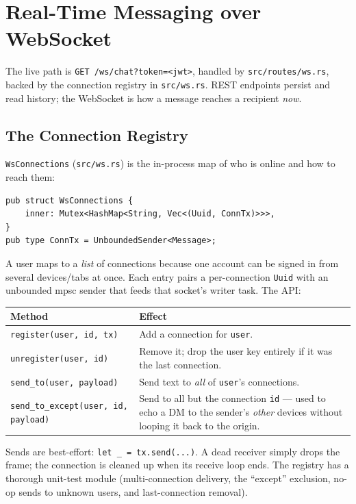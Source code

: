 \chapter{Real-Time Messaging over WebSocket}
\label{chap:websocket}

The live path is \verb|GET /ws/chat?token=<jwt>|, handled by
\verb|src/routes/ws.rs|, backed by the connection registry in \verb|src/ws.rs|.
REST endpoints persist and read history; the WebSocket is how a message reaches a
recipient \emph{now}.

\section{The Connection Registry}

\verb|WsConnections| (\verb|src/ws.rs|) is the in-process map of who is online and
how to reach them:

\begin{lstlisting}
pub struct WsConnections {
    inner: Mutex<HashMap<String, Vec<(Uuid, ConnTx)>>>,
}
pub type ConnTx = UnboundedSender<Message>;
\end{lstlisting}

A user maps to a \emph{list} of connections because one account can be signed in
from several devices/tabs at once. Each entry pairs a per-connection \verb|Uuid|
with an unbounded mpsc sender that feeds that socket's writer task. The API:

\begin{center}
\begin{tabular}{@{}lp{}@{}}
\toprule
\textbf{Method} & \textbf{Effect} \\
\midrule
\verb|register(user, id, tx)| & Add a connection for \verb|user|. \\
\verb|unregister(user, id)| & Remove it; drop the user key entirely if it was the last connection. \\
\verb|send_to(user, payload)| & Send text to \emph{all} of \verb|user|'s connections. \\
\verb|send_to_except(user, id, payload)| & Send to all but the connection \verb|id| --- used to echo a DM to the sender's \emph{other} devices without looping it back to the origin. \\
\bottomrule
\end{tabular}
\end{center}

Sends are best-effort: \verb|let _ = tx.send(...)|. A dead receiver simply drops
the frame; the connection is cleaned up when its receive loop ends. The registry
has a thorough unit-test module (multi-connection delivery, the ``except''
exclusion, no-op sends to unknown users, and last-connection removal).

